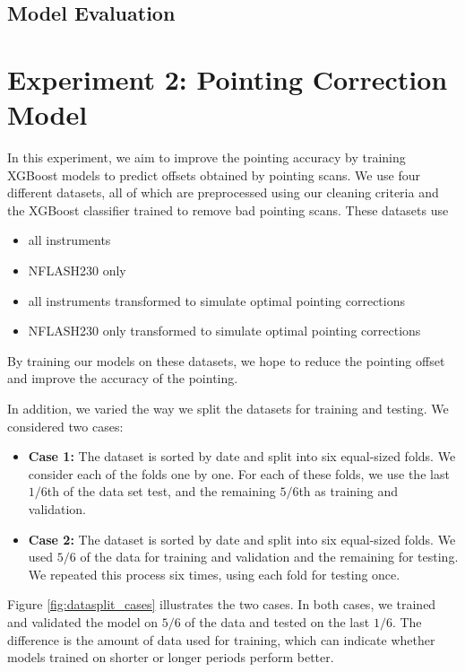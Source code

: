 \subsection{Model Evaluation}

\section{Experiment 2: Pointing Correction Model}
In this experiment, we aim to improve the pointing accuracy by training XGBoost models to predict offsets obtained by pointing scans.
We use four different datasets, all of which are preprocessed using our cleaning criteria and the XGBoost classifier trained to remove bad pointing scans.
These datasets use
\begin{itemize}
\item all instruments
\item NFLASH230 only
\item all instruments transformed to simulate optimal pointing corrections
\item NFLASH230 only transformed to simulate optimal pointing corrections
\end{itemize}

By training our models on these datasets, we hope to reduce the pointing offset and improve the accuracy of the pointing.

In addition, we varied the way we split the datasets for training and testing.
We considered two cases:

\begin{itemize}
    \item \textbf{Case 1:} The dataset is sorted by date and split into six equal-sized folds.
    We consider each of the folds one by one.
    For each of these folds, we use the last $1/6$th of the data set test, and the remaining $5/6$th as training and validation.
    \item \textbf{Case 2:} The dataset is sorted by date and split into six equal-sized folds.
    We used $5/6$ of the data for training and validation and the remaining for testing.
    We repeated this process six times, using each fold for testing once.
\end{itemize}

Figure \ref{fig:datasplit_cases} illustrates the two cases.
In both cases, we trained and validated the model on $5/6$ of the data and tested on the last $1/6$.
The difference is the amount of data used for training, which can indicate whether models trained on shorter or longer periods perform better.

